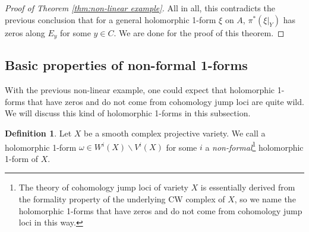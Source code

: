 \documentclass[a4paper,12pt,reqno]{amsart}
\theoremstyle{question}
\theoremstyle{definition}
\newtheorem{definition}[theorem]{Definition}
\theoremstyle{remark}
\theoremstyle{cited}
\theoremstyle{citeddef}
\begin{document}
\begin{proof}[Proof of Theorem \ref{thm:non-linear example}]
All in all, this contradicts the previous conclusion that for a general holomorphic 1-form $\xi$ on $A$, $\pi^{\ast}(\xi|_Y)$ has zeros along $E_y$ for some $y\in C$. We are done for the proof of this theorem.
\end{proof}














\subsection{Basic properties of non-formal 1-forms}

With the previous non-linear example, one could expect that holomorphic 1-forms that have zeros and do not come from cohomology jump loci are quite wild. We will discuss this kind of  holomorphic 1-forms in this subsection.

\begin{definition}
Let $X$ be a smooth complex projective variety. We call a holomorphic 1-form $\omega\in W^i(X)\backslash V^i(X)$ for some $i$ a \textit{non-formal}\footnote{The theory of cohomology jump loci  of variety $X$ is essentially derived from the formality property of the underlying CW complex of $X$, so we name the holomorphic 1-forms that have zeros and do not come from cohomology jump loci in this way.} holomorphic 1-form of $X$.
\end{definition}
 
\end{document}
